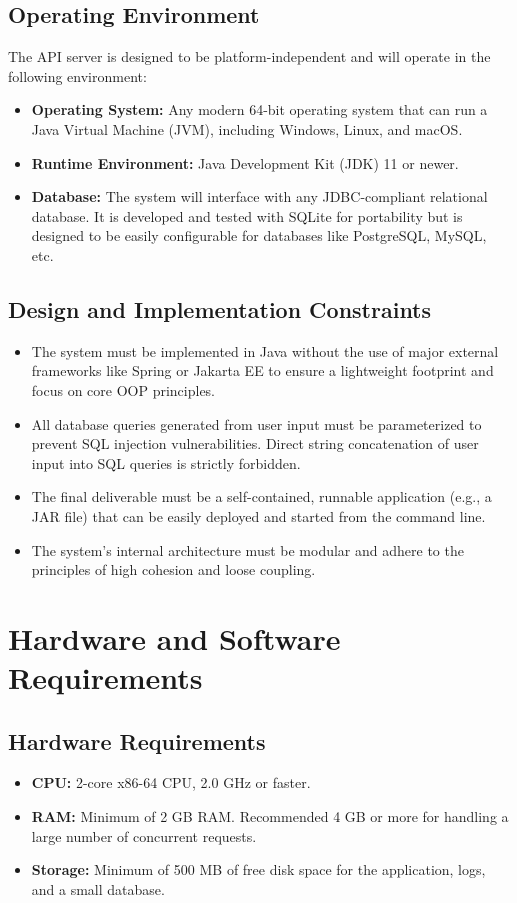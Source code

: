 \documentclass[12pt, a4paper]{report}
\begin{document}
\subsection{Operating Environment}
The API server is designed to be platform-independent and will operate in the following environment:
\begin{itemize}
    \item \textbf{Operating System:} Any modern 64-bit operating system that can run a Java Virtual Machine (JVM), including Windows, Linux, and macOS.
    \item \textbf{Runtime Environment:} Java Development Kit (JDK) 11 or newer.
    \item \textbf{Database:} The system will interface with any JDBC-compliant relational database. It is developed and tested with SQLite for portability but is designed to be easily configurable for databases like PostgreSQL, MySQL, etc.
\end{itemize}

\subsection{Design and Implementation Constraints}
\begin{itemize}
    \item The system must be implemented in Java without the use of major external frameworks like Spring or Jakarta EE to ensure a lightweight footprint and focus on core OOP principles.
    \item All database queries generated from user input must be parameterized to prevent SQL injection vulnerabilities. Direct string concatenation of user input into SQL queries is strictly forbidden.
    \item The final deliverable must be a self-contained, runnable application (e.g., a JAR file) that can be easily deployed and started from the command line.
    \item The system's internal architecture must be modular and adhere to the principles of high cohesion and loose coupling.
\end{itemize}

\section{Hardware and Software Requirements}
\subsection{Hardware Requirements}
\begin{itemize}
    \item \textbf{CPU:} 2-core x86-64 CPU, 2.0 GHz or faster.
    \item \textbf{RAM:} Minimum of 2 GB RAM. Recommended 4 GB or more for handling a large number of concurrent requests.
    \item \textbf{Storage:} Minimum of 500 MB of free disk space for the application, logs, and a small database.
\end{itemize}
\end{document}
